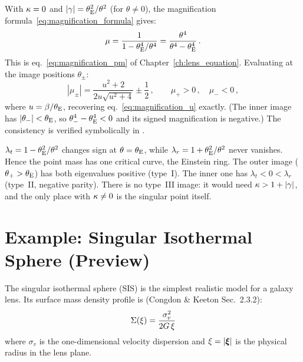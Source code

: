 With $\kappa = 0$ and $|\gamma| = \theta_{\mathrm{E}}^2/\theta^2$ (for
$\theta \neq 0$), the magnification formula~\eqref{eq:magnification_formula}
gives:
\begin{equation}
    \mu = \frac{1}{1 - \theta_{\mathrm{E}}^4/\theta^4}
    = \frac{\theta^4}{\theta^4 - \theta_{\mathrm{E}}^4} \,.
    \label{eq:mu_point_mass}
\end{equation}
This is eq.~\eqref{eq:magnification_pm} of
Chapter~\ref{ch:lens_equation}.  Evaluating at the image positions
$\theta_\pm$:
\begin{equation}
    |\mu_\pm| = \frac{u^2 + 2}{2u\sqrt{u^2 + 4}} \pm \frac{1}{2} \,,
    \qquad \mu_+ > 0 \,, \quad \mu_- < 0 \,,
    \label{eq:mu_pm_recovered}
\end{equation}
where $u = \beta/\theta_{\mathrm{E}}$, recovering eq.~\eqref{eq:magnification_u}
exactly.  (The inner image has $|\theta_-| < \theta_{\mathrm{E}}$, so
$\theta_-^4 - \theta_{\mathrm{E}}^4 < 0$ and its signed magnification is negative.)  The consistency is verified symbolically in
.
\begin{annotation}
$\lambda_t = 1 - \theta_{\mathrm{E}}^2/\theta^2$ changes sign at $\theta = \theta_{\mathrm{E}}$, while
$\lambda_r = 1 + \theta_{\mathrm{E}}^2/\theta^2$ never vanishes. Hence the point mass has
one critical curve, the Einstein ring. The outer image ($\theta_+ > \theta_{\mathrm{E}}$)
has both eigenvalues positive (type~I). The inner one has $\lambda_t < 0 < \lambda_r$
(type~II, negative parity). There is no type~III image: it would need
$\kappa > 1 + |\gamma|$, and the only place with $\kappa \neq 0$ is the
singular point itself.
\end{annotation}


\section{Example: Singular Isothermal Sphere (Preview)}
\label{sec:sis_preview}

The singular isothermal sphere (SIS) is the simplest realistic model
for a galaxy lens.  Its surface mass density profile is
(Congdon \& Keeton Sec.~2.3.2):
\begin{equation}
    \Sigma(\xi) = \frac{\sigma_v^2}{2G\,\xi}
    \label{eq:sis_sigma_preview}
\end{equation}
where $\sigma_v$ is the one-dimensional velocity dispersion and
$\xi = |\boldsymbol{\xi}|$ is the physical radius in the lens plane.

